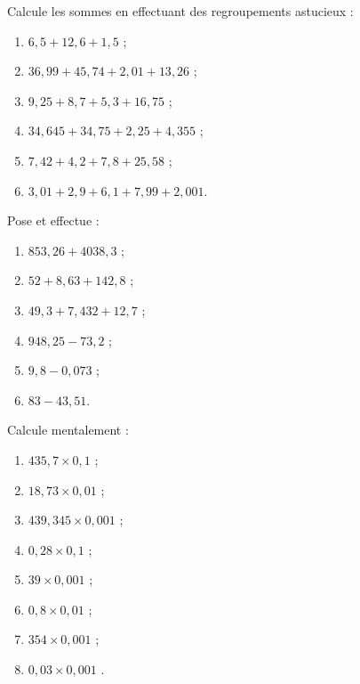 \begin{exercice}
Calcule les sommes en effectuant des regroupements astucieux :
\begin{enumerate} 
 \item $6,5 + 12,6 + 1,5$ ;
 \item $36,99 + 45,74 + 2,01 + 13,26$ ;
 \item $9,25 + 8,7 + 5,3 + 16,75$ ;
 \item $34,645 + 34,75 + 2,25 + 4,355$ ;
 \item $7,42 + 4,2 + 7,8 + 25,58$ ;
 \item $3,01 + 2,9 + 6,1 + 7,99 + 2,001$.
 \end{enumerate}
\end{exercice}
\begin{exercice}
Pose et effectue :
\begin{enumerate} 
 \item $853,26 + 4 038,3$ ;
 \item $52 + 8,63 + 142,8$ ;
 \item $49,3 + 7,432 + 12,7$ ;
 \item $948,25 - 73,2$ ;
 \item $9,8 - 0,073$ ;
 \item $83 - 43,51$.
 \end{enumerate} 
 \end{exercice}
\begin{exercice}
Calcule mentalement :
\begin{enumerate} 
 \item $435,7 \times 0,1$ \dotfill ; 
 
 \item $18,73 \times 0,01$ \dotfill ; 
 
 \item $439,345 \times 0,001$ \dotfill ; 
 
 \item $0,28 \times 0,1$ \dotfill ; 
 
 \item $39 \times 0,001$ \dotfill ; 
 
 \item $0,8 \times 0,01$ \dotfill ; 
 
 \item $354 \times 0,001$ \dotfill ; 
 
 \item $0,03 \times 0,001$ \dotfill. 
 
 \end{enumerate}
\end{exercice}
